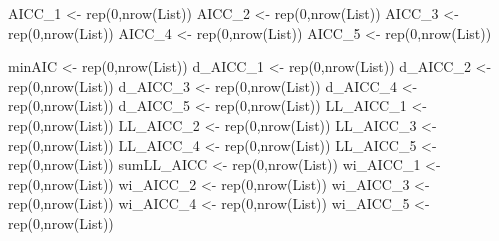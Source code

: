 \documentclass[
  letterpaper,
]{book}
\newenvironment{Shaded}{\begin{snugshade}}{\end{snugshade}}
\newcommand{\DecValTok}[1]{\textcolor[rgb]{0.68,0.00,0.00}{#1}}
\newcommand{\FunctionTok}[1]{\textcolor[rgb]{0.28,0.35,0.67}{#1}}
\newcommand{\NormalTok}[1]{\textcolor[rgb]{0.00,0.23,0.31}{#1}}
\newcommand{\OtherTok}[1]{\textcolor[rgb]{0.00,0.23,0.31}{#1}}
\begin{document}
\begin{Shaded}
\begin{Highlighting}[]
\NormalTok{AICC\_1 }\OtherTok{\textless{}{-}} \FunctionTok{rep}\NormalTok{(}\DecValTok{0}\NormalTok{,}\FunctionTok{nrow}\NormalTok{(List))}
\NormalTok{AICC\_2 }\OtherTok{\textless{}{-}} \FunctionTok{rep}\NormalTok{(}\DecValTok{0}\NormalTok{,}\FunctionTok{nrow}\NormalTok{(List))}
\NormalTok{AICC\_3 }\OtherTok{\textless{}{-}} \FunctionTok{rep}\NormalTok{(}\DecValTok{0}\NormalTok{,}\FunctionTok{nrow}\NormalTok{(List))}
\NormalTok{AICC\_4 }\OtherTok{\textless{}{-}} \FunctionTok{rep}\NormalTok{(}\DecValTok{0}\NormalTok{,}\FunctionTok{nrow}\NormalTok{(List))}
\NormalTok{AICC\_5 }\OtherTok{\textless{}{-}} \FunctionTok{rep}\NormalTok{(}\DecValTok{0}\NormalTok{,}\FunctionTok{nrow}\NormalTok{(List))}

\NormalTok{minAIC }\OtherTok{\textless{}{-}} \FunctionTok{rep}\NormalTok{(}\DecValTok{0}\NormalTok{,}\FunctionTok{nrow}\NormalTok{(List))}
\NormalTok{d\_AICC\_1 }\OtherTok{\textless{}{-}} \FunctionTok{rep}\NormalTok{(}\DecValTok{0}\NormalTok{,}\FunctionTok{nrow}\NormalTok{(List))}
\NormalTok{d\_AICC\_2 }\OtherTok{\textless{}{-}} \FunctionTok{rep}\NormalTok{(}\DecValTok{0}\NormalTok{,}\FunctionTok{nrow}\NormalTok{(List))}
\NormalTok{d\_AICC\_3 }\OtherTok{\textless{}{-}} \FunctionTok{rep}\NormalTok{(}\DecValTok{0}\NormalTok{,}\FunctionTok{nrow}\NormalTok{(List))}
\NormalTok{d\_AICC\_4 }\OtherTok{\textless{}{-}} \FunctionTok{rep}\NormalTok{(}\DecValTok{0}\NormalTok{,}\FunctionTok{nrow}\NormalTok{(List))}
\NormalTok{d\_AICC\_5 }\OtherTok{\textless{}{-}} \FunctionTok{rep}\NormalTok{(}\DecValTok{0}\NormalTok{,}\FunctionTok{nrow}\NormalTok{(List))}
\NormalTok{LL\_AICC\_1 }\OtherTok{\textless{}{-}} \FunctionTok{rep}\NormalTok{(}\DecValTok{0}\NormalTok{,}\FunctionTok{nrow}\NormalTok{(List))}
\NormalTok{LL\_AICC\_2 }\OtherTok{\textless{}{-}} \FunctionTok{rep}\NormalTok{(}\DecValTok{0}\NormalTok{,}\FunctionTok{nrow}\NormalTok{(List))}
\NormalTok{LL\_AICC\_3 }\OtherTok{\textless{}{-}} \FunctionTok{rep}\NormalTok{(}\DecValTok{0}\NormalTok{,}\FunctionTok{nrow}\NormalTok{(List))}
\NormalTok{LL\_AICC\_4 }\OtherTok{\textless{}{-}} \FunctionTok{rep}\NormalTok{(}\DecValTok{0}\NormalTok{,}\FunctionTok{nrow}\NormalTok{(List))}
\NormalTok{LL\_AICC\_5 }\OtherTok{\textless{}{-}} \FunctionTok{rep}\NormalTok{(}\DecValTok{0}\NormalTok{,}\FunctionTok{nrow}\NormalTok{(List))}
\NormalTok{sumLL\_AICC }\OtherTok{\textless{}{-}} \FunctionTok{rep}\NormalTok{(}\DecValTok{0}\NormalTok{,}\FunctionTok{nrow}\NormalTok{(List))}
\NormalTok{wi\_AICC\_1 }\OtherTok{\textless{}{-}} \FunctionTok{rep}\NormalTok{(}\DecValTok{0}\NormalTok{,}\FunctionTok{nrow}\NormalTok{(List))}
\NormalTok{wi\_AICC\_2 }\OtherTok{\textless{}{-}} \FunctionTok{rep}\NormalTok{(}\DecValTok{0}\NormalTok{,}\FunctionTok{nrow}\NormalTok{(List))}
\NormalTok{wi\_AICC\_3 }\OtherTok{\textless{}{-}} \FunctionTok{rep}\NormalTok{(}\DecValTok{0}\NormalTok{,}\FunctionTok{nrow}\NormalTok{(List))}
\NormalTok{wi\_AICC\_4 }\OtherTok{\textless{}{-}} \FunctionTok{rep}\NormalTok{(}\DecValTok{0}\NormalTok{,}\FunctionTok{nrow}\NormalTok{(List))}
\NormalTok{wi\_AICC\_5 }\OtherTok{\textless{}{-}} \FunctionTok{rep}\NormalTok{(}\DecValTok{0}\NormalTok{,}\FunctionTok{nrow}\NormalTok{(List))}
\end{Highlighting}
\end{Shaded}
\end{document}
